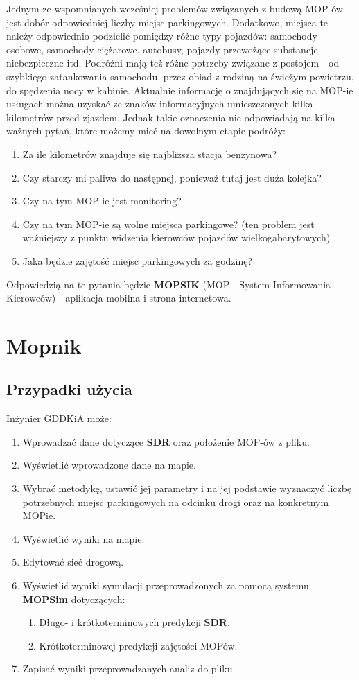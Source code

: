 Jednym ze wspomnianych wcześniej problemów związanych z budową MOP-ów jest dobór odpowiedniej liczby miejsc parkingowych. Dodatkowo, miejsca te należy odpowiednio podzielić pomiędzy różne typy pojazdów: samochody osobowe, samochody ciężarowe, autobusy, pojazdy przewożące substancje niebezpieczne itd. Podróżni mają też różne potrzeby związane z postojem - od szybkiego zatankowania samochodu, przez obiad z rodziną na świeżym powietrzu, do spędzenia nocy w kabinie. \newline Aktualnie informację o znajdujących się na MOP-ie usługach można uzyskać ze znaków informacyjnych umieszczonych kilka kilometrów przed zjazdem. Jednak takie oznaczenia nie odpowiadają na kilka ważnych pytań, które możemy mieć na dowolnym etapie podróży:
\begin{enumerate}
	\item Za ile kilometrów znajduje się najbliższa stacja benzynowa? 
	\item Czy starczy mi paliwa do następnej, ponieważ tutaj jest duża kolejka?
	\item Czy na tym MOP-ie jest monitoring?
	\item Czy na tym MOP-ie są wolne miejsca parkingowe? (ten problem jest ważniejszy z punktu widzenia kierowców pojazdów wielkogabarytowych)
	\item Jaka będzie zajętość miejsc parkingowych za godzinę?
\end{enumerate}

Odpowiedzią na te pytania będzie \textbf{MOPSIK} (MOP - System Informowania Kierowców) - aplikacja mobilna i strona internetowa.

\chapter{Mopnik}\label{r:mopnik}

\section{Przypadki użycia}
Inżynier GDDKiA może:
\begin{enumerate}
  \item Wprowadzać dane dotyczące \textbf{SDR} oraz położenie MOP-ów z pliku.
  \item Wyświetlić wprowadzone dane na mapie.
  \item Wybrać metodykę, ustawić jej parametry i na jej podstawie wyznaczyć
    liczbę potrzebnych miejsc parkingowych na odcinku drogi oraz na konkretnym
    MOPie.
  \item Wyświetlić wyniki na mapie.
  \item Edytować sieć drogową. 
  \item Wyświetlić wyniki symulacji przeprowadzonych za pomocą systemu
    \textbf{MOPSim} dotyczących:
    \begin{enumerate}
      \item Długo- i krótkoterminowych predykcji \textbf{SDR}.
      \item Krótkoterminowej predykcji zajętości MOPów.
    \end{enumerate}
  \item Zapisać wyniki przeprowadzanych analiz do pliku.
\end{enumerate}

